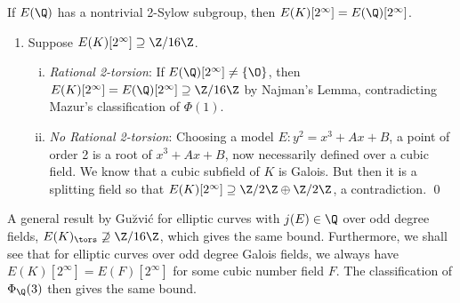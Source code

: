 \begin{frame}[plain,t] 
\footnotesize
\begin{lem}[Najman, 2015]
If $E(\Q)$ has a nontrivial 2-Sylow subgroup, then $E(K)[2^\infty]= E(\Q)[2^\infty]$. 
\end{lem}

\begin{enumerate}[--]
\item Suppose $E(K)[2^\infty] \supseteq \Z/16\Z$. 
	\begin{enumerate}[(i)] \footnotesize
	\item {\itshape Rational 2-torsion}: If $E(\Q)[2^\infty] \neq \{ \O \}$, then $E(K)[2^\infty]= E(\Q)[2^\infty] \supseteq \Z/16\Z$ by Najman's Lemma, contradicting Mazur's classification of $\Phi(1)$. \pspace
	\item {\itshape No Rational 2-torsion}: Choosing a model $E: y^2= x^3 + Ax + B$, a point of order 2 is a root of $x^3 + Ax + B$, now necessarily defined over a cubic field. We know that a cubic subfield of $K$ is Galois. But then it is a splitting field so that $E(K)[2^\infty] \supseteq \Z/2\Z \oplus \Z/2\Z$, a contradiction. \hfill \qed
	\end{enumerate}
\end{enumerate}

\begin{rem} 
A general result by Gu{\u{z}}vi\'c for elliptic curves with $j(E) \in \Q$ over odd degree fields, $E(K)_\tors \not\supseteq \Z/16\Z$, which gives the same bound. Furthermore, we shall see that for elliptic curves over odd degree Galois fields, we always have $E(K)[2^\infty]= E(F)[2^\infty]$ for some cubic number field $F$. The classification of $\Phi_\Q(3)$ then gives the same bound. 
\end{rem}
\end{frame}





